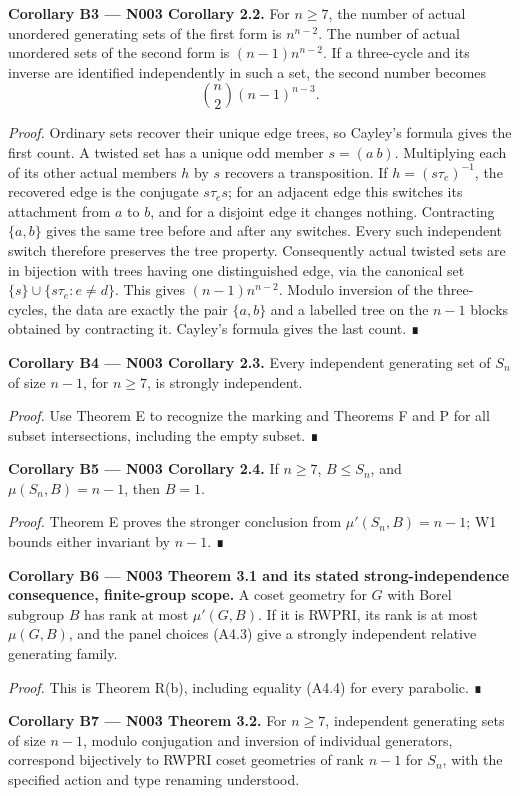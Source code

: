 \documentclass[
  10pt,
  letterpaper,
]{article}
\begin{document}
\textbf{Corollary B3 --- N003 Corollary 2.2.} For \(n\geq7\), the number
of actual unordered generating sets of the first form is \(n^{n-2}\).
The number of actual unordered sets of the second form is
\((n-1)n^{n-2}\). If a three-cycle and its inverse are identified
independently in such a set, the second number becomes \[
\binom n2(n-1)^{n-3}.
\]

\emph{Proof.} Ordinary sets recover their unique edge trees, so Cayley's
formula gives the first count. A twisted set has a unique odd member
\(s=(a\ b)\). Multiplying each of its other actual members \(h\) by
\(s\) recovers a transposition. If \(h=(s\tau_e)^{-1}\), the recovered
edge is the conjugate \(s\tau_es\); for an adjacent edge this switches
its attachment from \(a\) to \(b\), and for a disjoint edge it changes
nothing. Contracting \(\{a,b\}\) gives the same tree before and after
any switches. Every such independent switch therefore preserves the tree
property. Consequently actual twisted sets are in bijection with trees
having one distinguished edge, via the canonical set
\(\{s\}\cup\{s\tau_e:e\ne d\}\). This gives \((n-1)n^{n-2}\). Modulo
inversion of the three-cycles, the data are exactly the pair \(\{a,b\}\)
and a labelled tree on the \(n-1\) blocks obtained by contracting it.
Cayley's formula gives the last count. ∎

\textbf{Corollary B4 --- N003 Corollary 2.3.} Every independent
generating set of \(S_n\) of size \(n-1\), for \(n\geq7\), is strongly
independent.

\emph{Proof.} Use Theorem E to recognize the marking and Theorems F and
P for all subset intersections, including the empty subset. ∎

\textbf{Corollary B5 --- N003 Corollary 2.4.} If \(n\geq7\),
\(B\leq S_n\), and \(\mu(S_n,B)=n-1\), then \(B=1\).

\emph{Proof.} Theorem E proves the stronger conclusion from
\(\mu'(S_n,B)=n-1\); W1 bounds either invariant by \(n-1\). ∎

\textbf{Corollary B6 --- N003 Theorem 3.1 and its stated
strong-independence consequence, finite-group scope.} A coset geometry
for \(G\) with Borel subgroup \(B\) has rank at most \(\mu'(G,B)\). If
it is RWPRI, its rank is at most \(\mu(G,B)\), and the panel choices
(A4.3) give a strongly independent relative generating family.

\emph{Proof.} This is Theorem R(b), including equality (A4.4) for every
parabolic. ∎

\textbf{Corollary B7 --- N003 Theorem 3.2.} For \(n\geq7\), independent
generating sets of size \(n-1\), modulo conjugation and inversion of
individual generators, correspond bijectively to RWPRI coset geometries
of rank \(n-1\) for \(S_n\), with the specified action and type renaming
understood.
\end{document}
